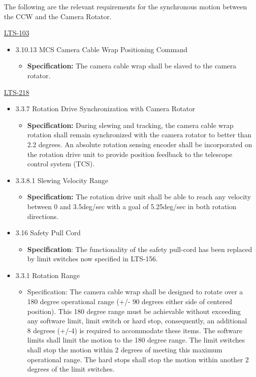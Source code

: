 \documentclass[SE,lsstdraft,authoryear,toc]{lsstdoc}
\begin{document}
The following are the relevant requirements for the synchronous motion
between the CCW and the Camera Rotator.

\underline{LTS-103}

\begin{itemize}
\item
  3.10.13 MCS Camera Cable Wrap Positioning Command

  \begin{itemize}
  \item
    \textbf{Specification:} The camera cable wrap shall be slaved to the
    camera rotator.
  \end{itemize}
\end{itemize}

\underline{LTS-218}

\begin{itemize}
\item
  3.3.7 Rotation Drive Synchronization with Camera Rotator

  \begin{itemize}
  \item
    \textbf{Specification:} During slewing and tracking, the camera
    cable wrap rotation shall remain synchronized with the camera
    rotator to better than 2.2 degrees. An absolute rotation sensing
    encoder shall be incorporated on the rotation drive unit to provide
    position feedback to the telescope control system (TCS).
  \end{itemize}
\item
  3.3.8.1 Slewing Velocity Range

  \begin{itemize}
  \item
    \textbf{Specification:} The rotation drive unit shall be able to
    reach any velocity between 0 and 3.5deg/sec with a goal of
    5.25deg/sec in both rotation directions.
  \end{itemize}
\item
  3.16 Safety Pull Cord

  \begin{itemize}
  \item
    \textbf{Specification}: The functionality of the safety pull-cord
    has been replaced by limit switches now specified in LTS-156.
  \end{itemize}
\item
  3.3.1 Rotation Range

  \begin{itemize}
  \item
    Specification: The camera cable wrap shall be designed to rotate
    over a 180 degree operational range (+/- 90 degrees either side of
    centered position). This 180 degree range must be achievable without
    exceeding any software limit, limit switch or hard stop,
    consequently, an additional 8 degrees (+/-4) is required to
    accommodate these items. The software limits shall limit the motion
    to the 180 degree range. The limit switches shall stop the motion
    within 2 degrees of meeting this maximum operational range. The hard
    stops shall stop the motion within another 2 degrees of the limit
    switches.
  \end{itemize}
\end{itemize}
\end{document}
